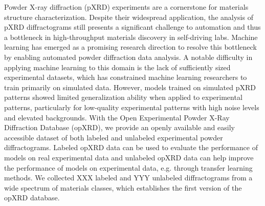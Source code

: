 Powder X-ray diffraction (pXRD) experiments are a cornerstone for materials structure characterization.
Despite their widespread application, the analysis of pXRD diffractograms still presents a significant challenge to automation and thus a bottleneck in high-throughput materials discovery in self-driving labs.
Machine learning has emerged as a promising research direction to resolve this bottleneck by enabling automated powder diffraction data analysis.
A notable difficulty in applying machine learning to this domain is the lack of sufficiently sized experimental datasets, which has constrained machine learning researchers to train primarily on simulated data. However, models trained on simulated pXRD patterns showed limited generalization ability when applied to experimental patterns, particularly for low-quality experimental patterns with high noise levels and elevated backgrounds.
With the Open Experimental Powder X-Ray Diffraction Database (opXRD), we provide an openly available and easily accessible dataset of both labeled and unlabeled experimental powder diffractograms.
Labeled opXRD data can be used to evaluate the performance of models on real experimental data and unlabeled opXRD data can help improve the performance of models on experimental data, e.g. through transfer learning methods.
We collected XXX labeled and YYY unlabeled diffractograms from a wide spectrum of materials classes, which establishes the first version of the opXRD database.
